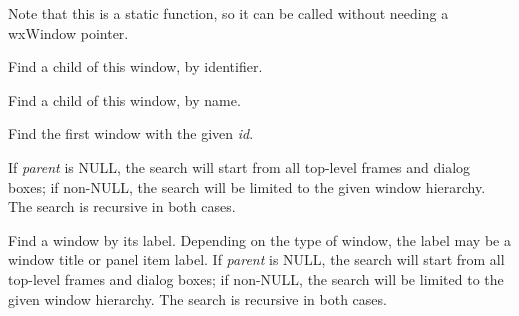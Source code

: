 
Note that this is a static function, so it can be called without needing a wxWindow pointer.





\label{wxwindowfindwindow}


Find a child of this window, by identifier.


Find a child of this window, by name.



\label{wxwindowfindwindowbyid}


Find the first window with the given {\it id}.

If {\it parent} is NULL, the search will start from all top-level
frames and dialog boxes; if non-NULL, the search will be limited to the given window hierarchy.
The search is recursive in both cases.




\label{wxwindowfindwindowbylabel}


Find a window by its label. Depending on the type of window, the label may be a window title
or panel item label. If {\it parent} is NULL, the search will start from all top-level
frames and dialog boxes; if non-NULL, the search will be limited to the given window hierarchy.
The search is recursive in both cases.

